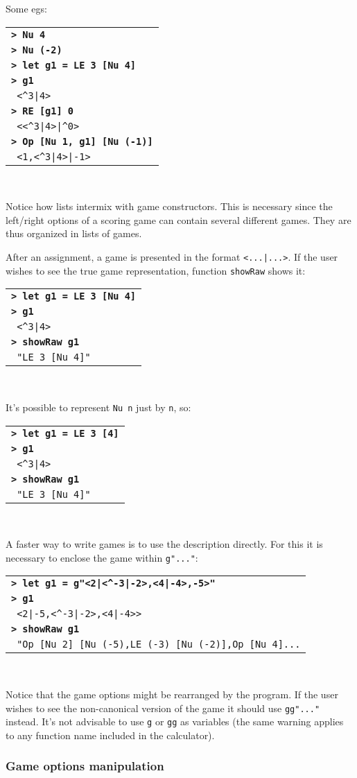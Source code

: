 \documentclass[a4paper,12pt]{article}
\newcommand{\bash}[1]{\small\textbf{\lstinline§> #1§}\\}
\newcommand{\out}[1]{\small\lstinline§ #1§}
\newcommand{\haskellCode}{\fontfamily{pcr}\selectfont}
\newenvironment{sgcode}
	{ \haskellCode
	  \begin{tabular}{|p{0.9\textwidth}|}
      \hline	
	}
	{ \\\hline  
      \end{tabular} \\
	  \par 
	}
\begin{document}
Some egs:

\begin{sgcode}
\bash{Nu 4}
\bash{Nu (-2)}
\bash{let g1 = LE 3 [Nu 4]}
\bash{g1}
\out{<^3|4>} \\
\bash{RE [g1] 0}
\out{<<^3|4>|^0>} \\
\bash{Op [Nu 1, g1] [Nu (-1)]}
\out{<1,<^3|4>|-1>}
\end{sgcode}

Notice how lists intermix with game constructors. This is necessary since the left/right options
of a scoring game can contain several different games. They are thus organized in lists of games.

After an assignment, a game is presented in the format \verb!<...|...>!. If the user wishes to 
see the true game representation, function \verb|showRaw| shows it:

\begin{sgcode}
\bash{let g1 = LE 3 [Nu 4]}
\bash{g1}
\out{<^3|4>} \\
\bash{showRaw g1}
\out{"LE 3 [Nu 4]"}
\end{sgcode}

It's possible to represent \verb|Nu n| just by \verb|n|, so:

\begin{sgcode}
\bash{let g1 = LE 3 [4]}
\bash{g1}
\out{<^3|4>} \\
\bash{showRaw g1}
\out{"LE 3 [Nu 4]"}
\end{sgcode}

A faster way to write games is to use the description directly. For this it is necessary
to enclose the game within \verb|g"..."|:

\begin{sgcode}
\bash{let g1 = g"<2|<^-3|-2>,<4|-4>,-5>"}
\bash{g1}
\out{<2|-5,<^-3|-2>,<4|-4>>} \\
\bash{showRaw g1}
\out{"Op [Nu 2] [Nu (-5),LE (-3) [Nu (-2)],Op [Nu 4]...}
\end{sgcode}

Notice that the game options might be rearranged by the program. If the user
wishes to see the non-canonical version of the game it should use \verb|gg"..."|
instead. It's not advisable to use \verb|g| or \verb|gg| as variables (the same
warning applies to any function name included in the calculator).

\subsubsection{Game options manipulation}
\end{document}
